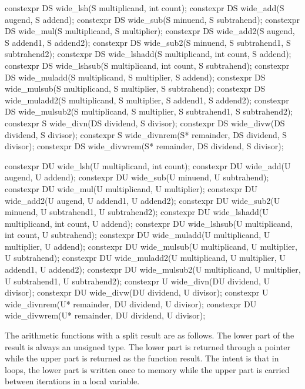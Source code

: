\begin{addedblock}
\begin{itemdecl}
constexpr DS wide_lsh(S multiplicand, int count);
constexpr DS wide_add(S augend, S addend);
constexpr DS wide_sub(S minuend, S subtrahend);
constexpr DS wide_mul(S multiplicand, S multiplier);
constexpr DS wide_add2(S augend, S addend1, S addend2);
constexpr DS wide_sub2(S minuend, S subtrahend1, S subtrahend2);
constexpr DS wide_lshadd(S multiplicand, int count, S addend);
constexpr DS wide_lshsub(S multiplicand, int count, S subtrahend);
constexpr DS wide_muladd(S multiplicand, S multiplier, S addend);
constexpr DS wide_mulsub(S multiplicand, S multiplier, S subtrahend);
constexpr DS wide_muladd2(S multiplicand, S multiplier, S addend1, S addend2);
constexpr DS wide_mulsub2(S multiplicand, S multiplier, S subtrahend1, S subtrahend2);
constexpr S wide_divn(DS dividend, S divisor);
constexpr DS wide_divw(DS dividend, S divisor);
constexpr S wide_divnrem(S* remainder, DS dividend, S divisor);
constexpr DS wide_divwrem(S* remainder, DS dividend, S divisor);

constexpr DU wide_lsh(U multiplicand, int count);
constexpr DU wide_add(U augend, U addend);
constexpr DU wide_sub(U minuend, U subtrahend);
constexpr DU wide_mul(U multiplicand, U multiplier);
constexpr DU wide_add2(U augend, U addend1, U addend2);
constexpr DU wide_sub2(U minuend, U subtrahend1, U subtrahend2);
constexpr DU wide_lshadd(U multiplicand, int count, U addend);
constexpr DU wide_lshsub(U multiplicand, int count, U subtrahend);
constexpr DU wide_muladd(U multiplicand, U multiplier, U addend);
constexpr DU wide_mulsub(U multiplicand, U multiplier, U subtrahend);
constexpr DU wide_muladd2(U multiplicand, U multiplier, U addend1, U addend2);
constexpr DU wide_mulsub2(U multiplicand, U multiplier, U subtrahend1, U subtrahend2);
constexpr U wide_divn(DU dividend, U divisor);
constexpr DU wide_divw(DU dividend, U divisor);
constexpr U wide_divnrem(U* remainder, DU dividend, U divisor);
constexpr DU wide_divwrem(U* remainder, DU dividend, U divisor);
\end{itemdecl}

The arithmetic functions with a split result are as follows. The lower part of the result is always an unsigned type. The lower part is returned through a pointer while the upper part is returned as the function result. The intent is that in loops, the lower part is written once to memory while the upper part is carried between iterations in a local variable.


\end{addedblock}
